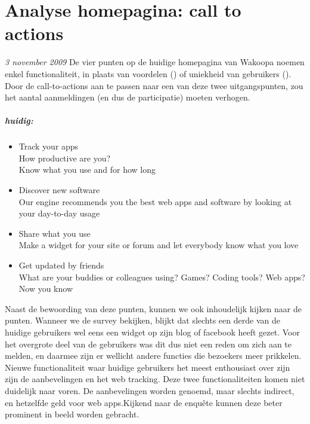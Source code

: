 \chapter{Analyse homepagina: call to actions}
\label{analysehomeappendix}
\textit{3 november 2009} De vier punten op de huidige homepagina van Wakoopa noemen enkel functionaliteit, in plaats van voordelen (\citet{Hoekman2008}) of uniekheid van gebruikers (\citet{Beenen2004}). Door de call-to-actions aan te passen naar een van deze twee uitgangspunten, zou het aantal aanmeldingen (en dus de participatie) moeten verhogen.

\paragraph{huidig:}
\begin{itemize}
    \item{Track your apps\\
      How productive are you?\\
      Know what you use and for how long}

    \item{Discover new software\\
      Our engine recommends you the best web apps and software by looking at your day-to-day usage}

    \item{Share what you use\\
      Make a widget for your site or forum and let everybody know what you love}

    \item{Get updated by friends\\
      What are your buddies or colleagues using? Games? Coding tools? Web apps? Now you know}
\end{itemize}

Naast de bewoording van deze punten, kunnen we ook inhoudelijk kijken naar de punten. Wanneer we de survey bekijken, blijkt dat slechts een derde van de huidige gebruikers wel eens een widget op zijn blog of facebook heeft gezet. Voor het overgrote deel van de gebruikers was dit dus niet een reden om zich aan te melden, en daarmee zijn er wellicht andere functies die bezoekers meer prikkelen. Nieuwe functionaliteit waar huidige gebruikers het meest enthousiast over zijn zijn de aanbevelingen en het web tracking. Deze twee functionaliteiten komen niet duidelijk naar voren. De aanbevelingen worden genoemd, maar slechts indirect, en hetzelfde geld voor web apps.Kijkend naar de enqu\^ete kunnen deze beter prominent in beeld worden gebracht.

